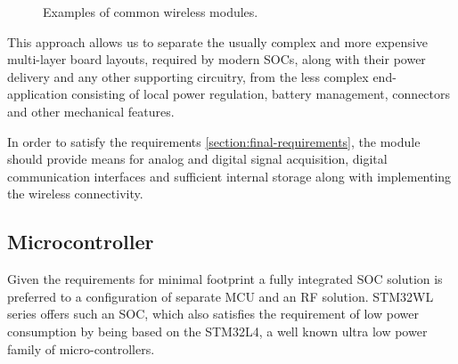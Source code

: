 \begin{figure}
    \centering
    \caption{\label{fig:wireless-modules}Examples of common wireless modules.}
\end{figure}

This approach allows us to separate the usually complex and more expensive multi-layer board layouts, required by modern SOCs, along with their power delivery and any other supporting circuitry, from the less complex end-application consisting of local power regulation, battery management, connectors and other mechanical features.

In order to satisfy the requirements \ref{section:final-requirements}, the module should provide means for analog and digital signal acquisition, digital communication interfaces and sufficient internal storage along with implementing the wireless connectivity.

\subsection{\label{section:mcu}Microcontroller}
Given the requirements for minimal footprint a fully integrated SOC solution is preferred to a configuration of separate MCU and an RF solution. STM32WL series offers such an SOC, which also satisfies the requirement of low power consumption by being based on the STM32L4, a well known ultra low power family of micro-controllers.


